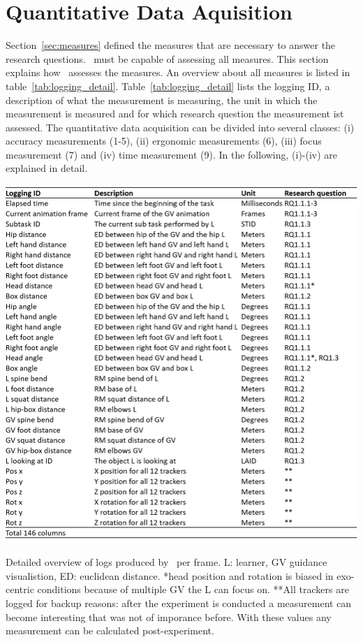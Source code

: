 \section{Quantitative Data Aquisition}
\label{sec:logging}
Section~\ref{sec:measures} defined the measures that are necessary to answer the research questions. \exgo\ must be capable of assessing all measures. This section explains how \exgo\ assesses the measures. An overview about all measures is listed in table~\ref{tab:logging_detail}. Table~\ref{tab:logging_detail} lists the logging ID, a description of what the measurement is measuring, the unit in which the measurement is measured and for which research question the measurement ist assessed. The quantitative data acquisition can be divided into several classes: (i) accuracy measurements (1-5), (ii) ergonomic measurements (6), (iii) focus measurement (7) and (iv) time measurement (9). In the following, (i)-(iv) are explained in detail.
\begin{table}[H]
	\centering
	\includegraphics[width=\textwidth]{figures/logging_detail.png}
	\caption[Logfile description]{Detailed overview of logs produced by \exgo\ per frame. L: learner, GV guidance visualistion, ED: euclidean distance. *head position and rotation is biased in exo-centric conditions because of multiple GV the L can focus on. **All trackers are logged for backup reasons: after the experiment is conducted a measurement can become interesting that was not of imporance before. With these values any measurement can be calculated post-experiment.}
	\label{tab:logging_detail}
\end{table}

